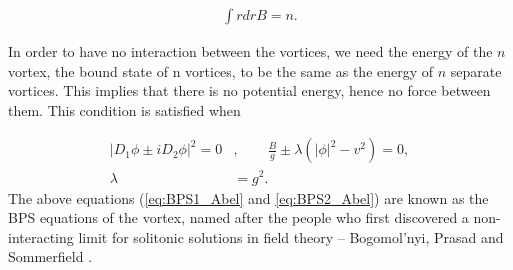     \begin{align}
        \int r dr B = n.
    \end{align}

    In order to have no interaction between the vortices, we need the energy of the $n$ vortex, the bound state of n vortices, to be the same as the energy of $n$ separate vortices. This implies that there is no potential energy, hence no force between them. This condition is satisfied when

    \begin{align}
        |D_1\phi \pm i D_2 \phi|^2 =0&,  \qquad \frac{B}{g} \pm \lambda \left(|\phi|^2 -v^2  \right) =0, \label{eq:BPS1_Abel}\\
        \lambda &= g^2 .\label{eq:BPS2_Abel}
    \end{align}
    The above equations (\eqref{eq:BPS1_Abel} and \eqref{eq:BPS2_Abel}) are known as the BPS equations of the vortex, named after the people who first discovered a non-interacting limit for solitonic solutions in field theory -- Bogomol'nyi, Prasad and Sommerfield \cite{Bogomolny:1975de} \cite{Prasad1975}.
    
